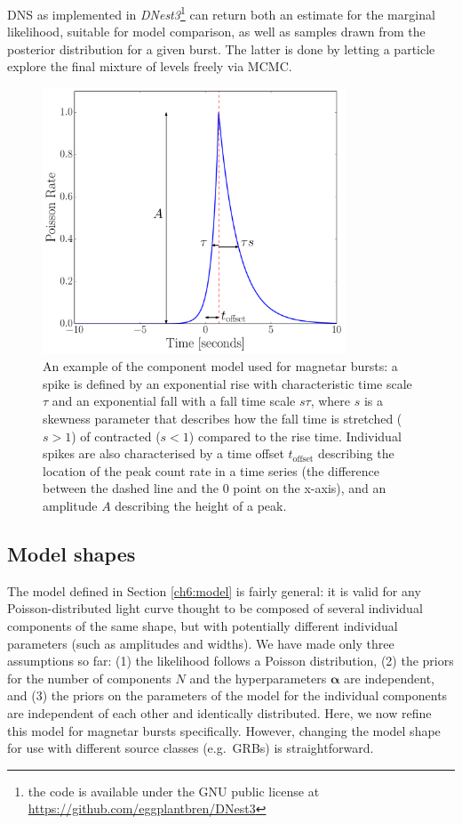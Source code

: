 \documentclass[12pt]{emulateapj}
\begin{document}
DNS as implemented in {\it DNest3}\footnote{the code is available under the GNU public license at \url{https://github.com/eggplantbren/DNest3}} can return both an estimate for the marginal likelihood,
suitable for model comparison, as well as samples drawn from the posterior distribution for a given burst. The latter is done by letting a particle explore
the final mixture of levels freely via MCMC. 
\begin{figure}[h]
\begin{center}
\includegraphics[width=9cm]{f2.pdf}%
\caption{An example of the component model used for magnetar bursts: a spike is defined by an exponential rise with characteristic
time scale $\tau$ and an exponential fall with a fall time scale $s\tau$, where $s$ is a skewness parameter that describes how the fall
time is stretched ($s > 1$) of contracted ($s < 1$) compared to the rise time. Individual spikes are also characterised by a time offset
$t_{\mathrm{offset}}$ describing the location of the peak count rate in a time series (the difference between the dashed line and the 0 point
on the x-axis), and an amplitude $A$ describing the height of a peak.}
\label{fig:word_example}
\end{center}
\end{figure}



\subsection{Model shapes}
\label{ch6:wordmodel}

The model defined in Section \ref{ch6:model} is fairly general: it is valid for any Poisson-distributed light curve thought to be composed of several individual components of
the same shape, but with potentially different individual parameters (such as amplitudes and widths). 
We have made only three assumptions so far: (1) the likelihood follows a Poisson distribution, (2) the priors for the number of components $N$ and the hyperparameters $\bm{\alpha}$ are independent,
and (3) the priors on the parameters of the model for the individual components are independent of each other and identically distributed. 
Here, we now refine this model for magnetar bursts specifically. However, changing the model shape for use with different source classes (e.g.\ GRBs) is straightforward.
\end{document}
